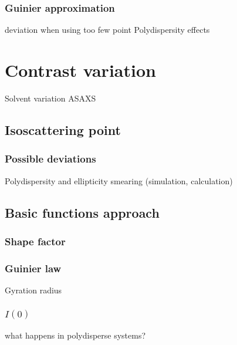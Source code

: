 \subsubsection{Guinier approximation}
deviation when using too few point
Polydispersity effects

\section{Contrast variation}
Solvent variation
ASAXS
\subsection{Isoscattering point}
\subsubsection{Possible deviations}
Polydispersity and ellipticity smearing (simulation, calculation)
\subsection{Basic functions approach}
\subsubsection{Shape factor}
\subsubsection{Guinier law}
Gyration radius
\subsubsection{$I(0)$}
what happens in polydisperse systems?
